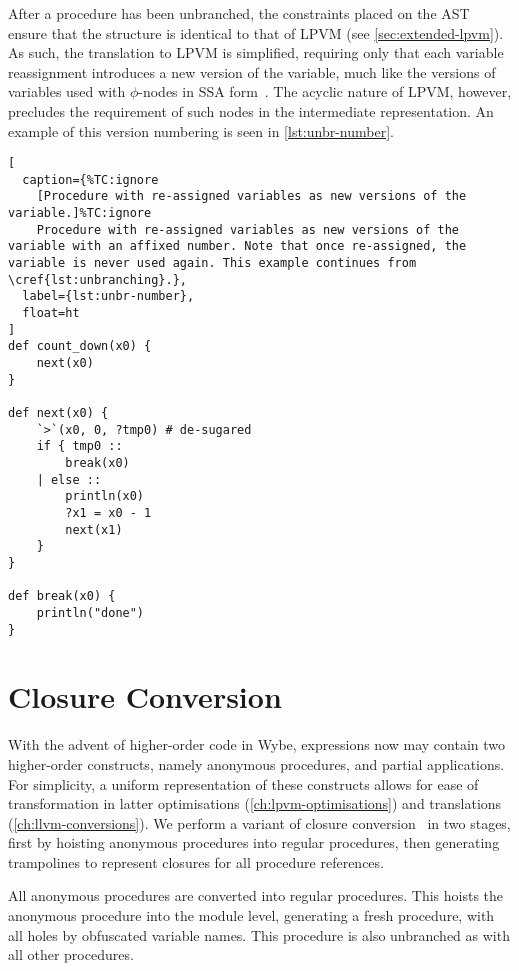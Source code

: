 After a procedure has been unbranched, the constraints placed on the AST ensure that the structure is identical to that of LPVM (see \cref{sec:extended-lpvm}). As such, the translation to LPVM is simplified, requiring only that each variable reassignment introduces a new version of the variable, much like the versions of variables used with $\phi$-nodes in SSA form~\cite{cytron1991efficiently}. The acyclic nature of LPVM, however, precludes the requirement of such nodes in the intermediate representation. An example of this version numbering is seen in \cref{lst:unbr-number}.

\begin{lstlisting}[
  caption={%TC:ignore
    [Procedure with re-assigned variables as new versions of the variable.]%TC:ignore
    Procedure with re-assigned variables as new versions of the variable with an affixed number. Note that once re-assigned, the variable is never used again. This example continues from \cref{lst:unbranching}.},
  label={lst:unbr-number},
  float=ht
]
def count_down(x0) {
    next(x0)
}

def next(x0) {
    `>`(x0, 0, ?tmp0) # de-sugared
    if { tmp0 :: 
        break(x0)
    | else :: 
        println(x0)
        ?x1 = x0 - 1
        next(x1)
    }
}

def break(x0) {
    println("done")
}
\end{lstlisting}

\section{Closure Conversion}
\label{sec:closure-conversion}

With the advent of higher-order code in Wybe, expressions now may contain two higher-order constructs, namely anonymous procedures, and partial applications. For simplicity, a uniform representation of these constructs allows for ease of transformation in latter optimisations (\cref{ch:lpvm-optimisations}) and translations (\cref{ch:llvm-conversions}). We perform a variant of closure conversion~\cite{landin1964mechanical} in two stages, first by hoisting anonymous procedures into regular procedures, then generating trampolines to represent closures for all procedure references.

All anonymous procedures are converted into regular procedures. This hoists the anonymous procedure into the module level, generating a fresh procedure, with all holes by obfuscated variable names. This procedure is also unbranched as with all other procedures. 

